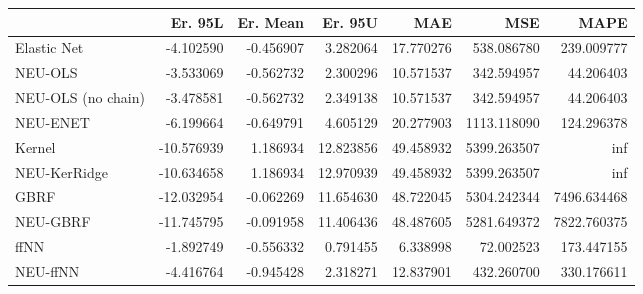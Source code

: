 \begin{tabular}{lrrrrrr}
\toprule
{} &    Er. 95L &  Er. Mean &    Er. 95U &        MAE &          MSE &         MAPE \\
\midrule
Elastic Net        &  -4.102590 & -0.456907 &   3.282064 &  17.770276 &   538.086780 &   239.009777 \\
NEU-OLS            &  -3.533069 & -0.562732 &   2.300296 &  10.571537 &   342.594957 &    44.206403 \\
NEU-OLS (no chain) &  -3.478581 & -0.562732 &   2.349138 &  10.571537 &   342.594957 &    44.206403 \\
NEU-ENET           &  -6.199664 & -0.649791 &   4.605129 &  20.277903 &  1113.118090 &   124.296378 \\
Kernel             & -10.576939 &  1.186934 &  12.823856 &  49.458932 &  5399.263507 &          inf \\
NEU-KerRidge       & -10.634658 &  1.186934 &  12.970939 &  49.458932 &  5399.263507 &          inf \\
GBRF               & -12.032954 & -0.062269 &  11.654630 &  48.722045 &  5304.242344 &  7496.634468 \\
NEU-GBRF           & -11.745795 & -0.091958 &  11.406436 &  48.487605 &  5281.649372 &  7822.760375 \\
ffNN               &  -1.892749 & -0.556332 &   0.791455 &   6.338998 &    72.002523 &   173.447155 \\
NEU-ffNN           &  -4.416764 & -0.945428 &   2.318271 &  12.837901 &   432.260700 &   330.176611 \\
\bottomrule
\end{tabular}
